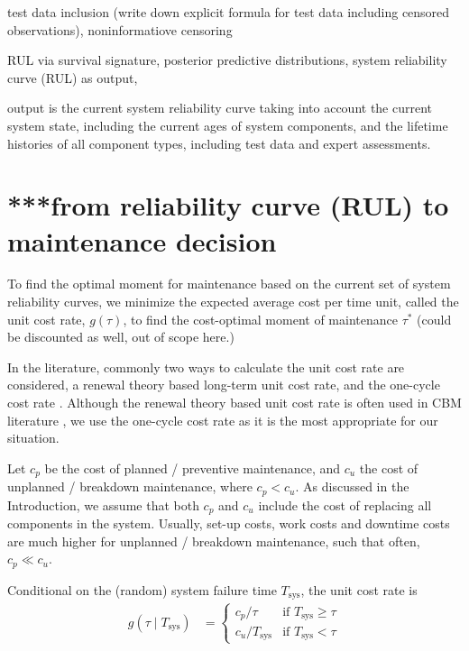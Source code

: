 \documentclass[authoryear]{elsarticle}
\newcommand{\Tsys}{T_\text{sys}}
\begin{document}
test data inclusion
(write down explicit formula for test data including censored observations),
noninformatiove censoring

RUL via survival signature,
posterior predictive distributions,
system reliability curve (RUL) as output,

output is the current system reliability curve
taking into account the current system state,
including the current ages of system components, 
and the lifetime histories of all component types,
including test data and expert assessments.


\section{***from reliability curve (RUL) to maintenance decision}

To find the optimal moment for maintenance based on the current set of system reliability curves,
we minimize the expected average cost per time unit,
called the unit cost rate, $g(\tau)$,
to find the cost-optimal moment of maintenance $\tau^*$
(could be discounted as well, out of scope here.)

In the literature, commonly two ways to calculate the unit cost rate are considered,
a renewal theory based long-term unit cost rate,
and the one-cycle cost rate 
\citep{1984:ansell-bendell-humble,1996:mazzuchi-soyer,2006:coolen-schrijner-coolen}.
Although the renewal theory based unit cost rate is often used
in CBM literature \citep{2013:si-et-al,2011:kim-et-al},
we use the one-cycle cost rate as it is the most appropriate for our situation.

Let $c_p$ be the cost of planned / preventive maintenance, and $c_u$ the cost of unplanned / breakdown maintenance, where $c_p < c_u$.
As discussed in the Introduction,
we assume that both $c_p$ and $c_u$ include the cost of replacing all components in the system.
Usually, set-up costs, work costs and downtime costs are much higher for unplanned / breakdown maintenance,
such that often, $c_p \ll c_u$.

Conditional on the (random) system failure time $\Tsys$, the unit cost rate is 
\begin{align*}
g(\tau \mid \Tsys) &=
\begin{cases}
c_p / \tau  & \text{if } \Tsys \ge \tau \\
c_u / \Tsys & \text{if } \Tsys < \tau
\end{cases}
\end{align*}
\end{document}
